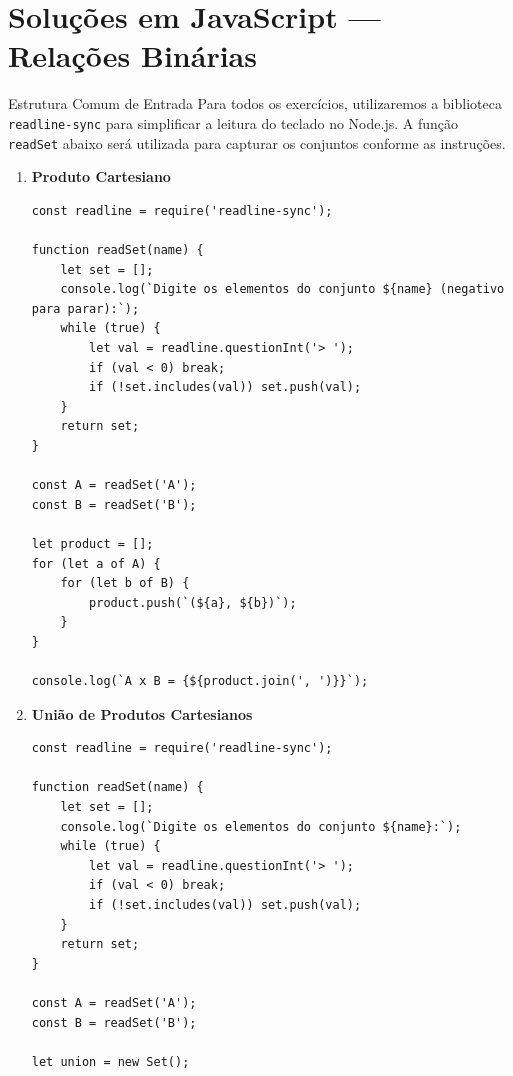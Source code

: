 \documentclass[12pt]{article}
\begin{document}
\vspace*{0.2cm}
\section*{Soluções em JavaScript — Relações Binárias}

\begin{block}{Estrutura Comum de Entrada}
Para todos os exercícios, utilizaremos a biblioteca \texttt{readline-sync} para simplificar a leitura do teclado no Node.js. A função \texttt{readSet} abaixo será utilizada para capturar os conjuntos conforme as instruções.
\end{block}

\vspace{0.4cm}

\begin{enumerate}

\item \textbf{Produto Cartesiano}
\begin{lstlisting}
const readline = require('readline-sync');

function readSet(name) {
    let set = [];
    console.log(`Digite os elementos do conjunto ${name} (negativo para parar):`);
    while (true) {
        let val = readline.questionInt('> ');
        if (val < 0) break;
        if (!set.includes(val)) set.push(val);
    }
    return set;
}

const A = readSet('A');
const B = readSet('B');

let product = [];
for (let a of A) {
    for (let b of B) {
        product.push(`(${a}, ${b})`);
    }
}

console.log(`A x B = {${product.join(', ')}}`);
\end{lstlisting}

\vspace{0.4cm}

\item \textbf{União de Produtos Cartesianos}
\begin{lstlisting}
const readline = require('readline-sync');

function readSet(name) {
    let set = [];
    console.log(`Digite os elementos do conjunto ${name}:`);
    while (true) {
        let val = readline.questionInt('> ');
        if (val < 0) break;
        if (!set.includes(val)) set.push(val);
    }
    return set;
}

const A = readSet('A');
const B = readSet('B');

let union = new Set(); 


\end{lstlisting}
\end{enumerate}
\end{document}
